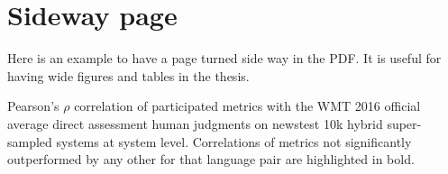 
\section{Sideway page}
Here is an example to have a page turned side way in the PDF. It is useful for having wide figures and tables in the thesis. 

\begin{landscape} 
\begin{table}
\caption{Pearson's
        $\rho $        correlation of participated metrics with the WMT 2016 official average
        direct assessment human judgments on newstest 10k hybrid super-sampled
        systems at system level. Correlations of metrics not significantly
        outperformed by any other for that language pair are highlighted in
        bold.}
\centering


\end{table}
\end{landscape}
